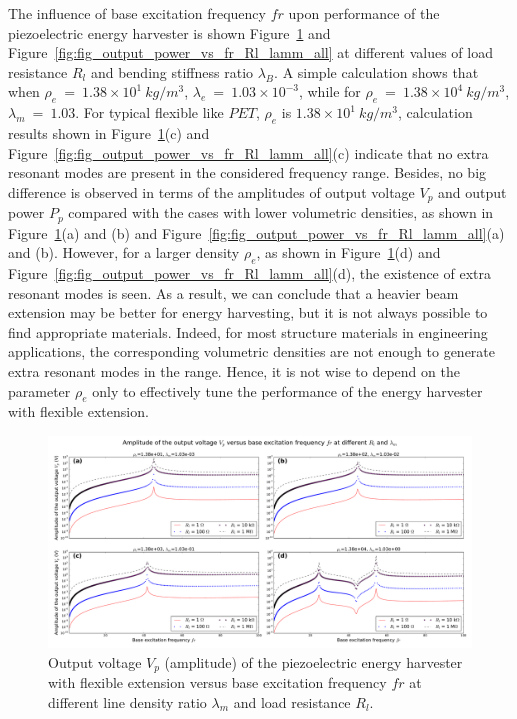 \documentclass{elsarticle}
\begin{document}
The influence of base excitation frequency $fr$ upon performance of the piezoelectric energy harvester is shown Figure~\ref{fig:fig_output_voltage_vs_fr_Rl_lamm_all} and Figure~\ref{fig:fig_output_power_vs_fr_Rl_lamm_all} at different values of load resistance $R_l$ and bending stiffness ratio $\lambda_B$. A simple calculation shows that when $\rho_e\ =\ 1.38\times10^1\ kg/m^3$, $\lambda_e\ =\ 1.03\times10^{-3}$, while for $\rho_e\ =\ 1.38\times10^4\ kg/m^3$, $\lambda_m\ =\ 1.03$. For typical flexible like $PET$\cite{dean1999lange}, $\rho_e$ is $1.38\times10^1\ kg/m^3$, calculation results shown in Figure~\ref{fig:fig_output_voltage_vs_fr_Rl_lamm_all}(c) and Figure~\ref{fig:fig_output_power_vs_fr_Rl_lamm_all}(c) indicate that no extra resonant modes are present in the considered frequency range. Besides, no big difference is observed in terms of the amplitudes of output voltage $V_p$ and output power $P_p$ compared with the cases with lower volumetric densities, as shown in Figure~\ref{fig:fig_output_voltage_vs_fr_Rl_lamm_all}(a) and (b) and Figure~\ref{fig:fig_output_power_vs_fr_Rl_lamm_all}(a) and (b). However, for a larger density $\rho_e$, as shown in Figure~\ref{fig:fig_output_voltage_vs_fr_Rl_lamm_all}(d) and Figure~\ref{fig:fig_output_power_vs_fr_Rl_lamm_all}(d), the existence of extra resonant modes is seen. As a result, we can conclude that a heavier beam extension may be better for energy harvesting, but it is not always possible to find appropriate materials. Indeed, for most structure materials in engineering applications, the corresponding volumetric densities are not enough to generate extra resonant modes in the range. Hence, it is not wise to depend on the parameter $\rho_e$ only to effectively tune the performance of the energy harvester with flexible extension. 

\begin{figure}[!htbp]
    \centering
    \includegraphics[width=\textwidth]{./fig_output_voltage_vs_fr_Rl_lamm_all}
    \caption{Output voltage $V_p$ (amplitude) of the piezoelectric energy harvester with flexible extension versus base excitation frequency $fr$ at different line density ratio $\lambda_m$ and load resistance $R_l$.}
    \label{fig:fig_output_voltage_vs_fr_Rl_lamm_all}
\end{figure}
\end{document}
